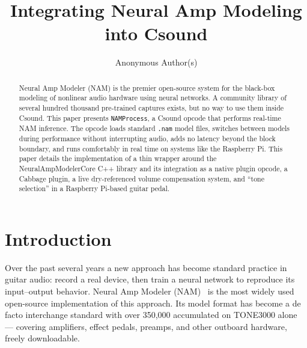 \documentclass[sigconf,anonymous,review]{nimeart}
\begin{document}
\title{Integrating Neural Amp Modeling into Csound}

\author{Anonymous Author(s)}

\renewcommand{\shortauthors}{Anon.}

\begin{abstract}
  Neural Amp Modeler (NAM) is the premier open-source system for the
  black-box modeling of nonlinear audio hardware using neural networks. A
  community library of several hundred thousand pre-trained captures
  exists, but no way to use them inside Csound. This paper presents
  \texttt{NAMProcess}, a Csound opcode that performs real-time NAM
  inference. The opcode loads standard \texttt{.nam} model files, switches
  between models during performance without interrupting audio, adds no
  latency beyond the block boundary, and runs comfortably in real time on
  systems like the Raspberry Pi. This paper details the implementation of
  a thin wrapper around the NeuralAmpModelerCore C++ library and its
  integration as a native plugin opcode, a Cabbage plugin, a live
  dry-referenced volume compensation system, and ``tone selection'' in a
  Raspberry Pi-based guitar pedal.
\end{abstract}


\maketitle

\section{Introduction}

Over the past several years a new approach has become standard practice in
guitar audio: record a real device, then train a neural network to
reproduce its input--output behavior. Neural Amp Modeler
(NAM)~\cite{atkinson2025slimmable, nam} is the most widely used
open-source implementation of this approach. Its model format has become a
de facto interchange standard with over 350,000 accumulated on TONE3000
alone~\cite{tone3000} --- covering amplifiers, effect pedals, preamps, and
other outboard hardware, freely downloadable.
\end{document}
